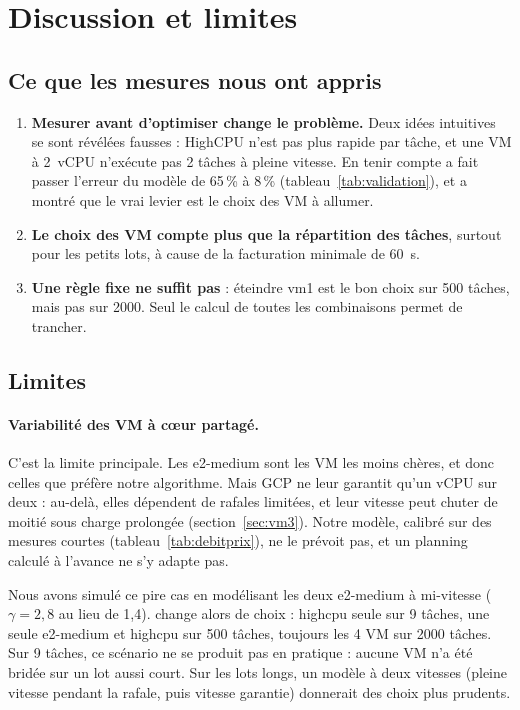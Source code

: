 \section{Discussion et limites}
\label{sec:limites}

\subsection{Ce que les mesures nous ont appris}
\begin{enumerate}
  \item \textbf{Mesurer avant d'optimiser change le problème.} Deux idées
        intuitives se sont révélées fausses : HighCPU n'est pas plus rapide
        par tâche, et une VM à 2~vCPU n'exécute pas 2 tâches à pleine vitesse.
        En tenir compte a fait passer l'erreur du modèle de 65\,\% à 8\,\%
        (tableau~\ref{tab:validation}), et a montré que le vrai levier est le
        choix des VM à allumer.
  \item \textbf{Le choix des VM compte plus que la répartition des tâches},
        surtout pour les petits lots, à cause de la facturation minimale de
        60~s.
  \item \textbf{Une règle fixe ne suffit pas} : éteindre vm1 est le bon choix
        sur 500 tâches, mais pas sur 2000. Seul le calcul de toutes les
        combinaisons permet de trancher.
\end{enumerate}

\subsection{Limites}

\paragraph{Variabilité des VM à cœur partagé.} C'est la limite principale. Les
e2-medium sont les VM les moins chères, et donc celles que préfère notre
algorithme. Mais GCP ne leur garantit qu'un vCPU sur deux : au-delà, elles
dépendent de rafales limitées, et leur vitesse peut chuter de moitié sous charge
prolongée (section~\ref{sec:vm3}). Notre modèle, calibré sur des mesures courtes
(tableau~\ref{tab:debitprix}), ne le prévoit pas, et un planning calculé à
l'avance ne s'y adapte pas.

Nous avons simulé ce pire cas en modélisant les deux e2-medium à mi-vitesse
($\gamma = 2{,}8$ au lieu de 1,4). \sel{} change alors de choix : highcpu seule
sur 9 tâches, une seule e2-medium et highcpu sur 500 tâches, toujours les 4 VM
sur 2000 tâches. Sur 9 tâches, ce scénario ne se produit pas en pratique : aucune
VM n'a été bridée sur un lot aussi court. Sur les lots longs, un modèle à deux
vitesses (pleine vitesse pendant la rafale, puis vitesse garantie) donnerait des
choix plus prudents.

